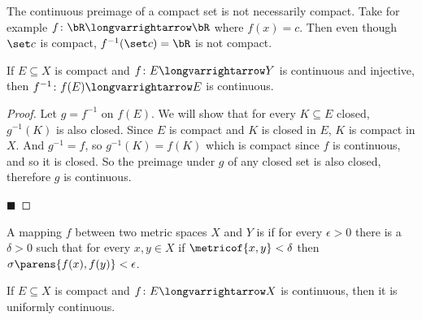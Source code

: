 \documentclass[10pt]{article}
\begin{document}
\begin{exam}

    The continuous preimage of a compact set is not necessarily compact.
    Take for example $f\colon\bR\longvarrightarrow\bR$ where $f(x)=c$.
    Then even though $\set c$ is compact, $f^{-1}(\set c)=\bR$ is not compact.

\end{exam}

\begin{prop*}

    If $E\subseteq X$ is compact and $f\colon E\longvarrightarrow Y$ is continuous and injective, then $f^{-1}\colon f(E)\longvarrightarrow E$ is continuous.

\end{prop*}

\begin{proof}

    Let $g=f^{-1}$ on $f(E)$.
    We will show that for every $K\subseteq E$ closed, $g^{-1}(K)$ is also closed.
    Since $E$ is compact and $K$ is closed in $E$, $K$ is compact in $X$.
    And $g^{-1}=f$, so $g^{-1}(K)=f(K)$ which is compact since $f$ is continuous, and so it is closed.
    So the preimage under $g$ of any closed set is also closed, therefore $g$ is continuous.

    \hfill$\blacksquare$

\end{proof}

\begin{defn*}

    A mapping $f$ between two metric spaces $X$ and $Y$ is  if for every $\epsilon>0$ there is a $\delta>0$ such that for every $x,y\in X$ if $\metricof{x,y}<\delta$ then
    $\sigma\parens{f(x),f(y)}<\epsilon$.

\end{defn*}


\begin{thrm*}

    If $E\subseteq X$ is compact and $f\colon E\longvarrightarrow X$ is continuous, then it is uniformly continuous.

\end{thrm*}
\end{document}
